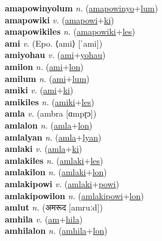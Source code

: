\textbf{amapowinyolum} \textit{n.} (\hyperref[amapowinyo]{amapowinyo}+\hyperref[lum]{lum})
 \label{amapowinyolum} \\
\textbf{amapowiki} \textit{v.} (\hyperref[amapowi]{amapowi}+\hyperref[ki]{ki})
 \label{amapowiki} \\
\textbf{amapowikiles} \textit{n.} (\hyperref[amapowiki]{amapowiki}+\hyperref[les]{les})
 \label{amapowikiles} \\
\textbf{ami} \textit{v.} (Epo. ⟨ami⟩ [ˈami])
 \label{ami} \\
\textbf{amiyohau} \textit{v.} (\hyperref[ami]{ami}+\hyperref[yohau]{yohau})
 \label{amiyohau} \\
\textbf{amilon} \textit{n.} (\hyperref[ami]{ami}+\hyperref[lon]{lon})
 \label{amilon} \\
\textbf{amilum} \textit{n.} (\hyperref[ami]{ami}+\hyperref[lum]{lum})
 \label{amilum} \\
\textbf{amiki} \textit{v.} (\hyperref[ami]{ami}+\hyperref[ki]{ki})
 \label{amiki} \\
\textbf{amikiles} \textit{n.} (\hyperref[amiki]{amiki}+\hyperref[les]{les})
 \label{amikiles} \\
\textbf{amla} \textit{v.} ({\javanese{}ambra} [ɑmpɽɔ])
 \label{amla} \\
\textbf{amlalon} \textit{n.} (\hyperref[amla]{amla}+\hyperref[lon]{lon})
 \label{amlalon} \\
\textbf{amlalyan} \textit{n.} (\hyperref[amla]{amla}+\hyperref[lyan]{lyan})
 \label{amlalyan} \\
\textbf{amlaki} \textit{v.} (\hyperref[amla]{amla}+\hyperref[ki]{ki})
 \label{amlaki} \\
\textbf{amlakiles} \textit{n.} (\hyperref[amlaki]{amlaki}+\hyperref[les]{les})
 \label{amlakiles} \\
\textbf{amlakilon} \textit{n.} (\hyperref[amlaki]{amlaki}+\hyperref[lon]{lon})
 \label{amlakilon} \\
\textbf{amlakipowi} \textit{v.} (\hyperref[amlaki]{amlaki}+\hyperref[powi]{powi})
 \label{amlakipowi} \\
\textbf{amlakipowilon} \textit{n.} (\hyperref[amlakipowi]{amlakipowi}+\hyperref[lon]{lon})
 \label{amlakipowilon} \\
\textbf{amlut} \textit{n.} ({\devanagari{}अमरूद} [amruːd])
 \label{amlut} \\
\textbf{amhila} \textit{v.} (\hyperref[am]{am}+\hyperref[hila]{hila})
 \label{amhila} \\
\textbf{amhilalon} \textit{n.} (\hyperref[amhila]{amhila}+\hyperref[lon]{lon})
